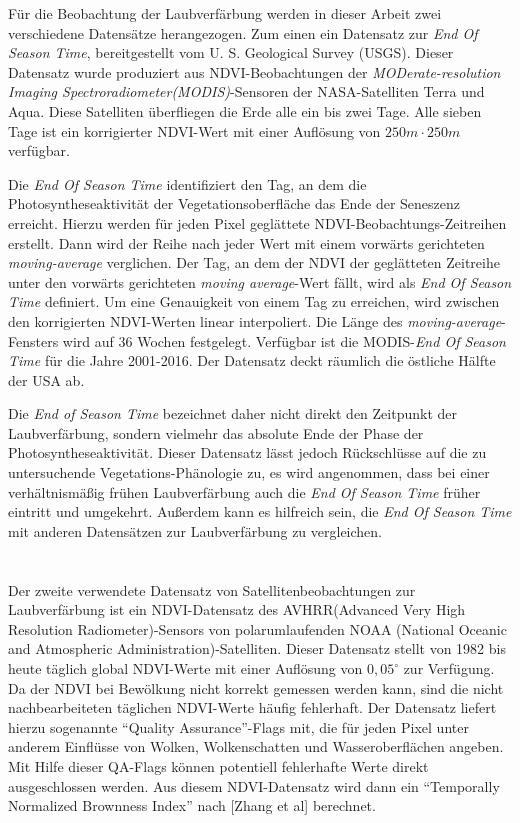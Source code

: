 \documentclass{article}
\begin{document}
Für die Beobachtung der Laubverfärbung werden in dieser Arbeit zwei verschiedene Datensätze herangezogen. Zum einen ein Datensatz zur \textit{End Of Season Time}, bereitgestellt vom U. S. Geological Survey (USGS). Dieser Datensatz wurde produziert aus NDVI-Beobachtungen der \textit{MODerate-resolution Imaging Spectroradiometer(MODIS)}-Sensoren der NASA-Satelliten Terra und Aqua. Diese Satelliten überfliegen die Erde alle ein bis zwei Tage. Alle sieben Tage ist ein korrigierter NDVI-Wert mit einer Auflösung von $250m \cdot 250m$ verfügbar.

Die \textit{End Of Season Time} identifiziert den Tag, an dem die Photosyntheseaktivität der Vegetationsoberfläche das Ende der Seneszenz erreicht. Hierzu werden für jeden Pixel geglättete NDVI-Beobachtungs-Zeitreihen erstellt. Dann wird der Reihe nach jeder Wert mit einem vorwärts gerichteten \textit{moving-average} verglichen. Der Tag, an dem der NDVI der geglätteten Zeitreihe unter den vorwärts gerichteten \textit{moving average}-Wert fällt, wird als \textit{End Of Season Time} definiert. Um eine Genauigkeit von einem Tag zu erreichen, wird zwischen den korrigierten NDVI-Werten linear interpoliert. Die Länge des \textit{moving-average}-Fensters wird auf 36 Wochen festgelegt. Verfügbar ist die MODIS-\textit{End Of Season Time} für die Jahre 2001-2016. Der Datensatz deckt räumlich die östliche Hälfte der USA ab.

Die \textit{End of Season Time} bezeichnet daher nicht direkt den Zeitpunkt der Laubverfärbung, sondern vielmehr das absolute Ende der Phase der Photosyntheseaktivität. Dieser Datensatz lässt jedoch Rückschlüsse auf die zu untersuchende Vegetations-Phänologie zu, es wird angenommen, dass bei einer verhältnismäßig frühen Laubverfärbung auch die \textit{End Of Season Time} früher eintritt und umgekehrt. Außerdem kann es hilfreich sein, die \textit{End Of Season Time} mit anderen Datensätzen zur Laubverfärbung zu vergleichen.
\\
\\
\\
Der zweite verwendete Datensatz von Satellitenbeobachtungen zur Laubverfärbung ist ein NDVI-Datensatz des AVHRR(Advanced Very High Resolution Radiometer)-Sensors von polarumlaufenden NOAA (National Oceanic and Atmospheric Administration)-Satelliten. Dieser Datensatz stellt von 1982 bis heute täglich global NDVI-Werte mit einer Auflösung von $0,05^\circ$ zur Verfügung. Da der NDVI bei Bewölkung nicht korrekt gemessen werden kann, sind die nicht nachbearbeiteten täglichen NDVI-Werte häufig fehlerhaft. Der Datensatz liefert hierzu sogenannte \enquote{Quality Assurance}-Flags mit, die für jeden Pixel unter anderem Einflüsse von Wolken, Wolkenschatten und Wasseroberflächen angeben. Mit Hilfe dieser QA-Flags können potentiell fehlerhafte Werte direkt ausgeschlossen werden. Aus diesem NDVI-Datensatz wird dann ein \enquote{Temporally Normalized Brownness Index} nach [Zhang et al] berechnet.                                       
\end{document}
